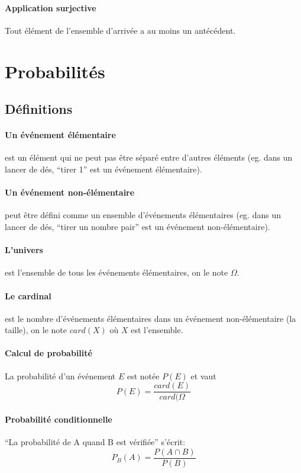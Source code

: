 \documentclass[10pt,a4paper,french]{article}
\begin{document}
\paragraph{Application surjective}
Tout élément de l'ensemble d'arrivée a au moins un antécédent.

\section{Probabilités}

\subsection{Définitions}

\paragraph{Un événement élémentaire} est un élément qui ne peut pas être séparé entre d'autres éléments (eg. dans un lancer de dés, ``tirer 1'' est un événement élémentaire).

\paragraph{Un événement non-élémentaire} peut être défini comme un ensemble d'événements élémentaires (eg. dans un lancer de dés, ``tirer un nombre pair'' est un événement non-élémentaire).

\paragraph{L'univers} est l'ensemble de tous les événements élémentaires, on le note $\Omega$.

\paragraph{Le cardinal} est le nombre d'événements élémentaires dans un événement non-élémentaire (la taille), on le note $card(X)$ où $X$ est l'ensemble.

\paragraph{Calcul de probabilité} La probabilité d'un événement $E$ est notée $P(E)$ et vaut \[ P(E) = \frac{card(E)}{card(\Omega} \]

\paragraph{Probabilité conditionnelle}
``La probabilité de A quand B est vérifiée'' s'écrit: \[ P_B(A)=\frac{P(A \cap B)}{P(B)} \]
\end{document}
